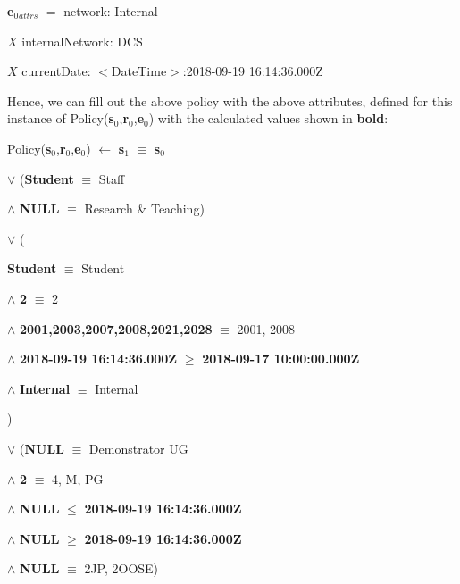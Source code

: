 \documentclass[a4paper,11pt]{article}
\begin{document}
\textbf{e$_{0}$}$_{attrs}$ $=$ network: Internal\par
\hspace{1.17cm}$X$ internalNetwork: DCS\par
\hspace{1.17cm}$X$ currentDate: $<$DateTime$>$:2018-09-19 16:14:36.000Z\\\par

Hence, we can fill out the above policy with the above attributes, defined for this instance of Policy(\textbf{s$_{0}$},\textbf{r$_{0}$},\textbf{e$_{0}$}) with the calculated values shown in \textbf{bold}:\\\par

Policy(\textbf{s$_{0}$},\textbf{r$_{0}$},\textbf{e$_{0}$}) $\leftarrow$ \textbf{s$_{1}$} $\equiv$ \textbf{s$_{0}$}\par
\hspace{2.3cm}$\vee{}$ (\textbf{Student} $\equiv$ Staff\par
\hspace{2.8cm}$\wedge{}$ \textbf{NULL} $\equiv$ Research \& Teaching)\par
\hspace{2.3cm}$\vee{}$ ({\color{Mahogany} \textbf{Student} $\equiv$ Student\par
\hspace{2.8cm}$\wedge{}$ \textbf{2} $\equiv$ 2\par
\hspace{2.8cm}$\wedge{}$ \textbf{2001,2003,2007,2008,2021,2028} $\equiv$ 2001, 2008\par
\hspace{2.8cm}$\wedge{}$ \textbf{2018-09-19 16:14:36.000Z} $\geq$ \textbf{2018-09-17 10:00:00.000Z}\par
\hspace{2.8cm}$\wedge{}$ \textbf{Internal} $\equiv$ Internal})\par
\hspace{2.3cm}$\vee{}$ (\textbf{NULL} $\equiv$ Demonstrator UG\par
\hspace{2.8cm}$\wedge{}$ \textbf{2} $\equiv$ 4, M, PG\par
\hspace{2.8cm}$\wedge{}$ \textbf{NULL} $\leq$ \textbf{2018-09-19 16:14:36.000Z}\par
\hspace{2.8cm}$\wedge{}$ \textbf{NULL} $\geq$ \textbf{2018-09-19 16:14:36.000Z}\par
\hspace{2.8cm}$\wedge{}$ \textbf{NULL} $\equiv$ 2JP, 2OOSE)
\\\par
\end{document}
